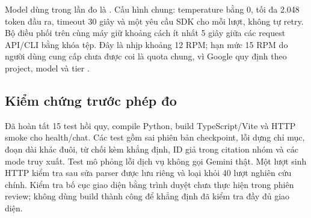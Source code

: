 Model dùng trong lần đo là  \cite{gemini}. Cấu hình chung: temperature bằng 0, tối đa 2.048 token đầu ra, timeout 30 giây và một yêu cầu SDK cho mỗi lượt, không tự retry. Bộ điều phối trên cùng máy giữ khoảng cách ít nhất 5 giây giữa các request API/CLI bằng khóa tệp. Đây là nhịp khoảng 12 RPM; hạn mức 15 RPM do người dùng cung cấp chưa được coi là quota chung, vì Google quy định theo project, model và tier \cite{quota}.

\subsection{Kiểm chứng trước phép đo}
Đã hoàn tất 15 test hồi quy, compile Python, build TypeScript/Vite và HTTP smoke cho health/chat. Các test gồm sai phiên bản checkpoint, lỗi dựng chỉ mục, đoạn dài khác đuôi, từ chối kèm khẳng định, ID giả trong citation nhóm và các mode truy xuất. Test mô phỏng lỗi dịch vụ không gọi Gemini thật. Một lượt sinh HTTP kiểm tra sau sửa parser được lưu riêng và loại khỏi 40 lượt nghiên cứu chính. Kiểm tra bố cục giao diện bằng trình duyệt chưa thực hiện trong phiên review; không dùng build thành công để khẳng định đã kiểm tra đầy đủ giao diện.
